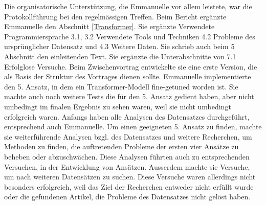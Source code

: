 Die organisatorische Unterstützung, die Emmanuelle vor allem leistete, war die Protokollführung bei den regelmässigen Treffen. 
Beim Bericht ergänzte Emmanuelle den Abschnitt \ref{Transformer}. Sie ergänzte Verwendete Programmiersprache 3.1, 3.2 Verwendete Tools und Techniken 4.2 Probleme des ursprünglicher Datensatz und 4.3 Weitere Daten. Sie schrieb auch beim 5 Abschnitt den einleitenden Text. Sie ergänzte die Unterabschnitte von 7.1 Erfolglose Versuche.
Beim Zwischenvortrag entwickelte sie eine erste Version, die als Basis der Struktur des Vortrages dienen sollte. 
Emmanuelle implementierte den 5. Ansatz, in dem ein Transformer-Modell fine-getuned worden ist. Sie machte auch noch weitere Tests die für den 5. Ansatz gedient haben, aber nicht umbedingt im finalen Ergebnis zu sehen waren, weil sie nicht umbedingt erfolgreich waren.
Anfangs haben alle Analysen des Datensatzes durchgeführt, entsprechend auch Emmanuelle. Um einen geeigneten 5. Ansatz zu finden, machte sie weiterführende Analysen bzgl. des Datensatzes und weitere Recherchen, um Methoden zu finden, die auftretenden Probleme der ersten vier Ansätze zu beheben oder abzuschwächen. Diese Analysen führten auch zu entsprechenden Versuchen, in der Entwicklung von Ansätzen.
Ausserdem machte sie Versuche, um nach weiteren Datensätzen zu suchen. %
Diese Versuche waren allerdings nicht besonders erfolgreich, weil das Ziel der Recherchen entweder nicht erfüllt wurde oder die gefundenen Artikel, die Probleme des Datensatzes nicht gelöst haben. 

